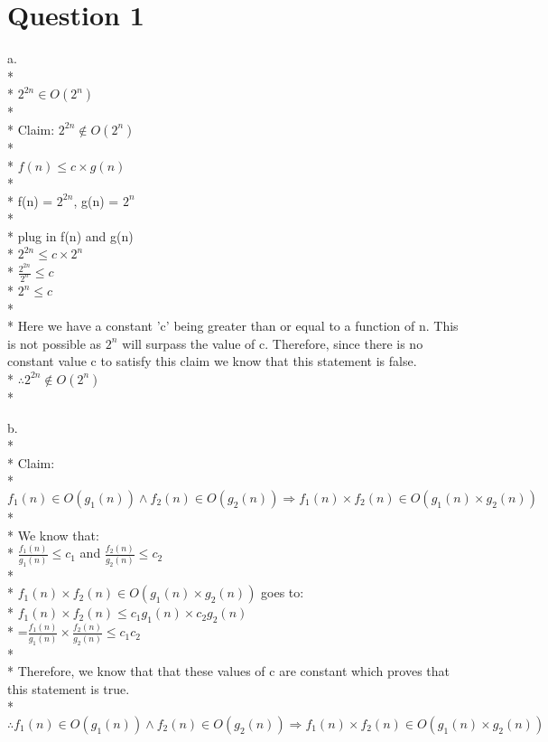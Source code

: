 \documentclass[11pt]{article}
\newcommand\tab[1][1cm]{\hspace*{#1}}
\begin{document}
\maketitle



\section*{Question 1}
\tab a.\\*\\*
$2^{2n} \in O(2^n)$\\*\\*
Claim: $2^{2n} \notin O(2^n)$\\*\\*
$f(n) \leq c \times g(n)$\\*\\*
f(n) = $2^{2n}$, g(n) = $2^n$\\*\\*
plug in f(n) and g(n)\\*
$2^{2n} \leq c \times 2^n$\\*
$\frac{2^{2n}}{2^n} \leq c$\\*
$2^n \leq c$\\*\\*
Here we have a constant 'c' being greater 
than or equal to a function of n. This is not 
possible as $2^n$ will surpass the value of c.
Therefore, since there is no constant value c
to satisfy this claim we know that this statement
is false.\\*
\tab $\therefore 2^{2n} \notin O(2^n)$\\*


\newpage
b.\\*\\*
Claim:\\*
$f_1(n) \in O(g_1(n)) \land f_2(n) \in O(g_2(n)) \Rightarrow f_1(n) \times f_2(n) \in O(g_1(n) \times g_2(n))$\\*\\*
We know that:\\*
$\frac{f_1(n)}{g_1(n)} \leq c_1$ and $\frac{f_2(n)}{g_2(n)} \leq c_2$\\*\\*
$f_1(n) \times f_2(n) \in O(g_1(n) \times g_2(n))$ goes to:\\*
$f_1(n) \times f_2(n) \leq c_1g_1(n) \times c_2g_2(n)$\\*
=$\frac{f_1(n)}{g_1(n)} \times \frac{f_2(n)}{g_2(n)} \leq c_1c_2$\\*\\*
Therefore, we know that that these values of c are constant which proves 
that this statement is true.\\*
$\therefore f_1(n) \in O(g_1(n)) \land f_2(n) \in O(g_2(n)) \Rightarrow f_1(n) \times f_2(n) \in O(g_1(n) \times g_2(n))$
\end{document}

